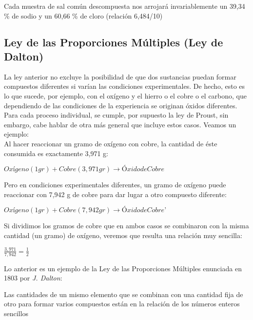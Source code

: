 Cada muestra de sal común descompuesta nos arrojará invariablemente un 39,34 \% de sodio y un 60,66 \% de cloro (relación 6,484/10)

\subsection{Ley de las Proporciones Múltiples (Ley de Dalton)}

La ley anterior no excluye la posibilidad de que dos sustancias puedan formar compuestos diferentes si varían las condiciones experimentales. De hecho, esto es lo que sucede, por ejemplo, con el oxígeno y el hierro o el cobre o el carbono, que dependiendo de las condiciones de la experiencia se originan óxidos diferentes. Para cada proceso individual, se cumple, por supuesto la ley de Proust, sin embargo, cabe hablar de otra más general que incluye estos casos. Veamos un ejemplo:\\

Al hacer reaccionar un gramo de oxígeno con cobre, la cantidad de éste consumida es exactamente 3,971 g:

\begin{center}
	$Oxígeno (1 gr) + Cobre  (3,971 gr) \rightarrow Óxido de Cobre
	$ 
\end{center}

Pero en condiciones experimentales diferentes, un gramo de oxígeno puede reaccionar con 7,942 g de cobre para dar lugar a otro compuesto diferente:

\begin{center}
	$Oxígeno (1 gr) + Cobre (7,942 gr) \rightarrow Óxido de Cobre’ $
\end{center}

Si dividimos los gramos de cobre que en ambos casos se combinaron con la misma cantidad (un gramo) de oxígeno, veremos que resulta una relación muy sencilla:

\begin{center}
	$\frac{3,971}{7,942}=\frac{1}{2}$
\end{center}

Lo anterior es un ejemplo de la Ley de las Proporciones Múltiples enunciada en 1803 por \emph{J. Dalton}:\\

\begin{law}
	Las cantidades de un mismo elemento que se combinan con una cantidad fija de otro para formar varios compuestos están en la relación de los números enteros sencillos
\end{law}

